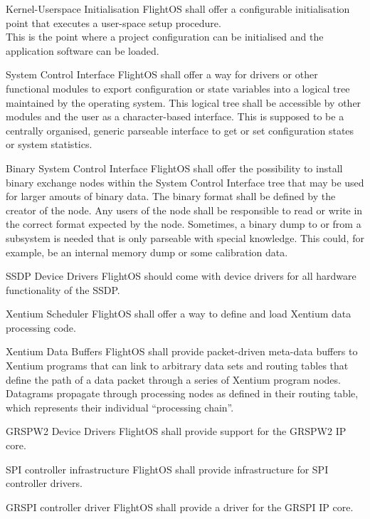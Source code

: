  {Kernel-Userspace Initialisation}{%
FlightOS shall offer a configurable initialisation point that executes a
user-space setup procedure.\\
}{%
This is the point where a project configuration can be initialised and the
application software can be loaded.%
}%

 {System Control Interface}{%
FlightOS shall offer a way for drivers or other functional modules to export
configuration or state variables into a logical tree maintained by
the operating system. This logical tree shall be accessible by other modules and
the user as a character-based interface.
}{%
This is supposed to be a centrally organised, generic parseable interface to
get or set configuration states or system statistics.
}%

 {Binary System Control Interface}{%
FlightOS shall offer the possibility to install binary exchange nodes within the
System Control Interface tree that may be used for larger amouts of binary data.
The binary format shall be defined by the creator of the node. Any users of the
node shall be responsible to read or write in the correct format expected by the
node.%
}{%
Sometimes, a binary dump to or from a subsystem is needed that is only parseable
with special knowledge. This could, for example, be an internal memory dump or
some calibration data.
}%

 {SSDP Device Drivers}{%
FlightOS should come with device drivers for all hardware functionality of the SSDP.
}{}%

 {Xentium Scheduler}{%
FlightOS shall offer a way to define and load Xentium data processing code.
}{}%

 {Xentium Data Buffers}{%
FlightOS shall provide packet-driven meta-data buffers to Xentium programs that
can link to arbitrary data sets and routing tables that define the path of
a data packet through a series of Xentium program nodes.
}{%
Datagrams propagate through processing nodes as defined in their routing table,
which represents their individual ``processing chain''.}%

 {GRSPW2 Device Drivers}{%
FlightOS shall provide support for the GRSPW2 IP core.
}{}%

 {SPI controller infrastructure}{%
FlightOS shall provide infrastructure for SPI controller drivers.
}{}%

 {GRSPI controller driver}{%
FlightOS shall provide a driver for the GRSPI IP core.
}{}%



